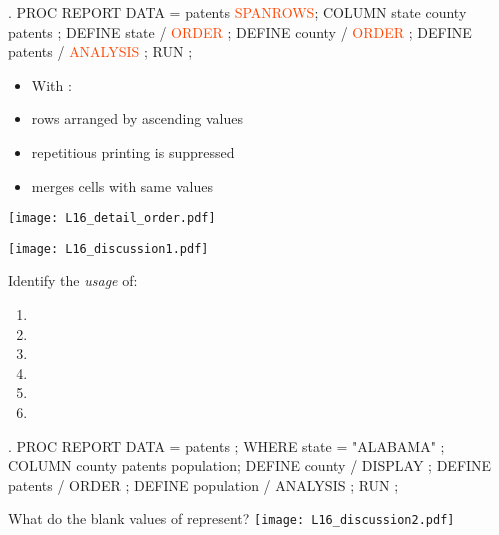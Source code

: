 \begin{frame}[fragile]
\hspace*{-0.3in}
\begin{code}{.}
PROC REPORT DATA = patents \textcolor{OrangeRed}{SPANROWS};
   COLUMN state county patents ;
   DEFINE state / \textcolor{OrangeRed}{ORDER} ;
   DEFINE county / \textcolor{OrangeRed}{ORDER} ;
   DEFINE patents / \textcolor{OrangeRed}{ANALYSIS} ;
RUN ;
\end{code}
\begin{itemize}
\item With :
\bi
\item rows arranged by ascending values
\item repetitious printing is suppressed
\ei
\item {} merges cells with same values
\end{itemize}
\emp
\blankcolumn
{}
\texttt{[image: L16\_detail\_order.pdf]}
\emp
\end{frame}

\begin{frame}
\texttt{[image: L16\_discussion1.pdf]}
\emp
{} \hspace{0.05in} \emp
{}
\begin{clicker}{Identify the \emph{usage} of:}
\begin{enumerate}
\item {}
\item[]
\item {}
\item[]
\item {}
\item[]
\end{enumerate}
\end{clicker}
\emp
\end{frame}

\begin{frame}[fragile]
\hspace*{-0.3in}
\begin{code}{.}
PROC REPORT DATA = patents  ;
   WHERE state = "ALABAMA" ;
   COLUMN county patents population;
   DEFINE county / DISPLAY ;
   DEFINE patents / ORDER ;
   DEFINE population / ANALYSIS ;
RUN ;
\end{code}
\vspace{10pt}
\oyo What do the blank values of  represent?
\emp
\blankcolumn
{}
\texttt{[image: L16\_discussion2.pdf]}
\emp

\end{frame}

